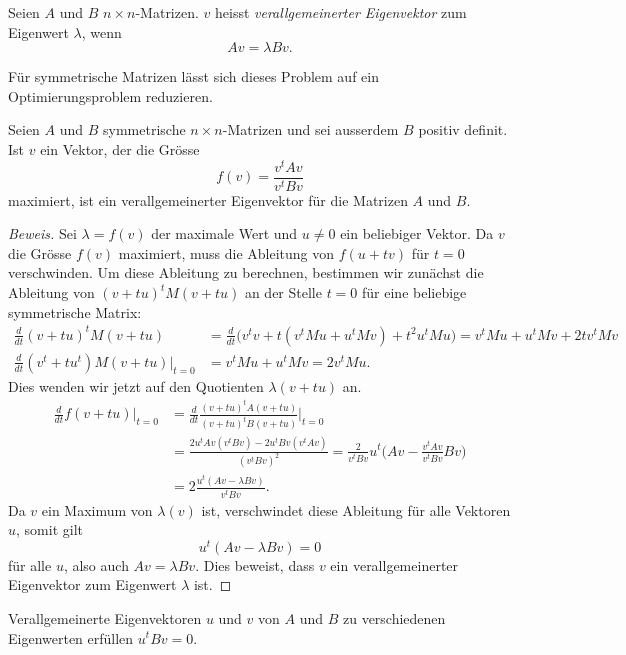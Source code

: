 \begin{definition}
%
%
\label{buch:orthogonal:sturm:verallgemeinerter-eigenvektor}
Seien $A$ und $B$ $n\times n$-Matrizen.
$v$ heisst {\em verallgemeinerter Eigenvektor} zum Eigenwert $\lambda$,
wenn
\[
Av = \lambda Bv.
\]
\end{definition}

Für symmetrische Matrizen lässt sich dieses Problem auf ein 
Optimierungsproblem reduzieren.

\begin{satz}
%
Seien $A$ und $B$ symmetrische $n\times n$-Matrizen und sei ausserdem
$B$ positiv definit.
Ist $v$ ein Vektor, der die Grösse
\[
f(v)=\frac{v^tAv}{v^tBv}
\]
maximiert, ist ein verallgemeinerter Eigenvektor für die Matrizen $A$
und $B$.
\end{satz}

\begin{proof}[Beweis]
Sei $\lambda = f(v)$ der maximale Wert und $u\ne 0$ ein beliebiger Vektor. 
Da $v$ die Grösse $f(v)$ maximiert, muss die Ableitung
von $f(u+tv)$ für $t=0$ verschwinden.
Um diese Ableitung zu berechnen, bestimmen wir zunächst die Ableitung
von $(v+tu)^tM(v+tu)$  an der Stelle $t=0$ für eine beliebige
symmetrische Matrix:
\begin{align*}
\frac{d}{dt}
(v+tu)^tM(v+tu)
&=
\frac{d}{dt}\bigl(
v^tv + t(v^tMu+u^tMv) + t^2 u^tMu
\bigr)
=
v^tMu+u^tMv + 2tv^tMv
\\
\frac{d}{dt}
(v^t+tu^t)M(v+tu)
\bigg|_{t=0}
&=
v^tMu+u^tMv
=
2v^tMu.
\end{align*}
Dies wenden wir jetzt auf den Quotienten $\lambda(v+tu)$ an.
\begin{align*}
\frac{d}{dt}f(v+tu)\bigg|_{t=0}
&=
\frac{d}{dt}
\frac{(v+tu)^tA(v+tu)}{(v+tu)^tB(v+tu)}\bigg|_{t=0}
\\
&=
\frac{2u^tAv(v^tBv) - 2u^tBv(v^tAv)}{(v^tBv)^2}
=
\frac{2}{v^tBv}
u^t
\biggl(
Av - \frac{v^tAv}{v^tBv} Bv
\biggr)
\\
&=
2
\frac{
u^t(
Av - \lambda Bv
)
}{v^tBv}.
\end{align*}
Da $v$ ein Maximum von $\lambda(v)$ ist, verschwindet diese Ableitung
für alle Vektoren $u$, somit gilt
\[
u^t(Av-\lambda Bv)=0
\]
für alle $u$, also auch $Av=\lambda Bv$.
Dies beweist, dass $v$ ein verallgemeinerter Eigenvektor zum
Eigenwert $\lambda$ ist.
\end{proof}

\begin{satz}
%
Verallgemeinerte Eigenvektoren $u$ und $v$ von $A$ und $B$
zu verschiedenen Eigenwerten erfüllen $u^tBv=0$.
\end{satz}

